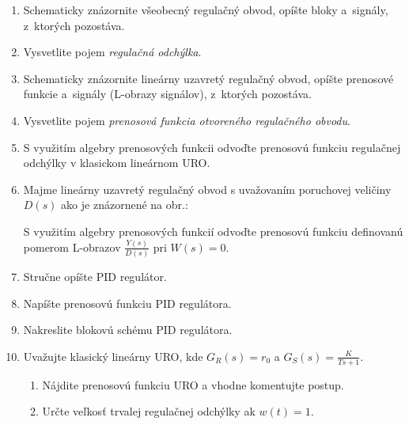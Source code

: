 \documentclass[a4paper, 10pt, ]{article}
\begin{document}
\begin{enumerate}[leftmargin=0pt, labelsep=3mm, itemsep=0pt]


    \item Schematicky znázornite všeobecný regulačný obvod, opíšte bloky a~signály, z~ktorých pozostáva.

    \item Vysvetlite pojem \emph{regulačná odchýlka}.

    \item Schematicky znázornite lineárny uzavretý regulačný obvod, opíšte prenosové funkcie a~signály (L-obrazy signálov), z~ktorých pozostáva.

    \item Vysvetlite pojem \emph{prenosová funkcia otvoreného regulačného obvodu}.

    \item S využitím algebry prenosových funkcii odvoďte prenosovú funkciu regulačnej odchýlky v klasickom lineárnom URO.

    \item Majme lineárny uzavretý regulačný obvod s uvažovaním poruchovej veličiny $D(s)$ ako je znázornené na obr.:

    \noindent
    \makebox[\textwidth][c]{%
    
    }

    \noindent
    S využitím algebry prenosových funkcií odvoďte prenosovú funkciu definovanú pomerom L-obrazov $\frac{Y(s)}{D(s)}$ pri $W(s) = 0$.



    \item Stručne opíšte PID regulátor.

    \item Napíšte prenosovú funkciu PID regulátora.

    \item Nakreslite blokovú schému PID regulátora.

    \item Uvažujte klasický lineárny URO, kde $\displaystyle G_R(s) = r_0$ a $\displaystyle G_S(s) = \frac{K}{Ts + 1}$.
    \begin{enumerate}
        \item Nájdite prenosovú funkciu URO a vhodne komentujte postup.
        \item Určte veľkosť trvalej regulačnej odchýlky ak $w(t) = 1$.
    \end{enumerate}


\end{enumerate}
\end{document}

